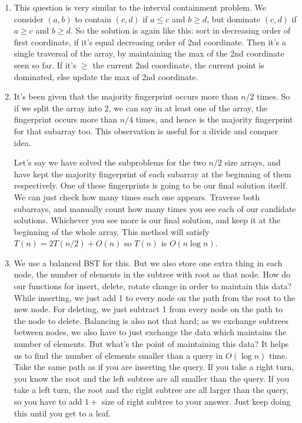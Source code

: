 \documentclass[12pt]{report}
\begin{document}
\begin{enumerate}[label=\textbf{\arabic*.}]
  \item This question is very similar to the interval containment problem. We consider $(a, b)$ to contain $(c, d)$ if $a \leq c$
  and $b \geq d$, but dominate $(c, d)$ if $a \geq c$ and $b \geq d$. So the solution is again like this: sort in decreasing order 
  of first coordinate, if it's equal decreasing order of 2nd coordinate. Then it's a single traversal of the array, by maintaining 
  the max of the 2nd coordinate seen so far. If it's $\geq$ the current 2nd coordinate, the current point is dominated, else update the 
  max of 2nd coordinate.

  \item It's been given that the majority fingerprint occurs more than $n/2$ times. So if we split the array into 2, we
  can say in at least one of the array, the fingerprint occurs more than $n/4$ times, and hence is the majority fingerprint for 
  that subarray too. This observation is useful for a divide and conquer idea.

  Let's say we have solved the subproblems for the two $n/2$ size arrays, and have kept the majority fingerprint of each subarray
  at the beginning of them respectively. One of these fingerprints is going to be our final solution itself. We can just check how 
  many times each one appears. Traverse both subarrays, and manually count how many times you see each of our candidate solutions.
  Whichever you see more is our final solution, and keep it at the beginning of the whole array. This method will satisfy 
  $T(n) = 2T(n/2) + O(n)$ so $T(n)$ is $O(n \log n)$.

  \item We use a balanced BST for this. But we also store one extra thing in each node, the number of elements in the subtree with
  root as that node. How do our functions for insert, delete, rotate change in order to maintain this data? While inserting, we just 
  add 1 to every node on the path from the root to the new node. For deleting, we just subtract 1 from every node on the path to the
  node to delete. Balancing is also not that hard; as we exchange subtrees between nodes, we also have to just exchange the data
  which maintains the number of elements. But what's the point of maintaining this data? It helps us to find the number of elements 
  smaller than a query in $O(\log n)$ time. Take the same path as if you are inserting the query. If you take a right turn, you know the 
  root and the left subtree are all smaller than the query. If you take a left turn, the root and the right subtree are all larger than 
  the query, so you have to add $1 + $ size of right subtree to your answer. Just keep doing this until you get to a leaf.


\end{enumerate}
\end{document}
